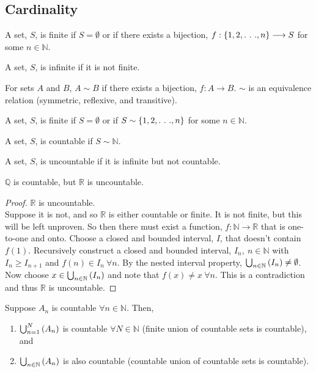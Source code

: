 \documentclass{article}
\begin{document}
\subsection{Cardinality}
\begin{defn}[Finite]
A set, $S$, is finite if $S=\emptyset$ or if there exists a bijection, $f: \{1,2,.\ .\ .,n\}\longrightarrow S$ for some $n\in\mathbb{N}$.
\end{defn}
\begin{defn}[Infinite]
A set, $S$, is infinite if it is not finite.
\end{defn}
For sets $A$ and $B$, $A\sim B$ if there exists a bijection, $f:A\longrightarrow B$. $\sim$ is an equivalence relation (symmetric, reflexive, and transitive).
\begin{defn}[Finite]
A set, $S$, is finite if $S=\emptyset$ or if $S\sim\{1,2,.\ .\ .,n\}$ for some $n\in\mathbb{N}$.
\end{defn}
\begin{defn}[Countable]
A set, $S$, is countable if $S\sim \mathbb{N}$.
\end{defn}
\begin{defn}[Uncountable]
A set, $S$, is uncountable if it is infinite but not countable.
\end{defn}
\begin{theorem}
$\mathbb{Q}$ is countable, but $\mathbb{R}$ is uncountable.
\end{theorem}
\begin{proof}$\mathbb{R}$ is uncountable. \\
Suppose it is not, and so $\mathbb{R}$ is either countable or finite. It is not finite, but this will be left unproven. So then there must exist a function, $f:\mathbb{N}\longrightarrow\mathbb{R}$ that is one-to-one and onto. Choose a closed and bounded interval, $I$, that doesn't contain $f(1)$. Recursively construct a closed and bounded interval, $I_n,\ n\in\mathbb{N}$ with $I_n\geq I_{n+1}$ and $f(n)\in I_n\ \forall n$. By the nested interval property, $\bigcup_{n\in\mathbb{N}}^{}\left(I_n\right)\neq\emptyset$. Now choose $x\in\bigcup_{n\in\mathbb{N}}^{}\left(I_n\right)$ and note that $f(x)\neq x\ \forall n$. This is a contradiction and thus $\mathbb{R}$ is uncountable.
\end{proof}

\begin{theorem}
Suppose $A_n$ is countable $\forall n\in\mathbb{N}$. Then,
\begin{enumerate}[label=\roman*)]
\item $\bigcup_{n=1}^{N}\left(A_n\right)$ is countable $\forall N\in\mathbb{N}$ (finite union of countable sets is countable), and
\item $\bigcup_{n\in\mathbb{N}}^{}\left(A_n\right)$ is also countable (countable union of countable sets is countable).
\end{enumerate}
\end{theorem}
\end{document}
